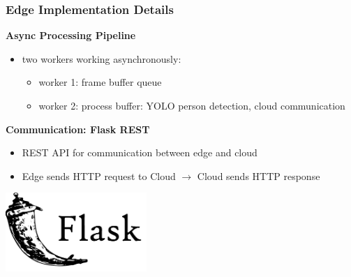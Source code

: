 \documentclass{beamer}
\begin{document}
\begin{frame}
    \frametitle{Edge Implementation Details}
    \textbf{Async Processing Pipeline}
    \begin{itemize}

    \item two workers working asynchronously: 
    \begin{itemize}
        \item worker 1: frame buffer queue
        \item worker 2: process buffer: YOLO person detection, cloud communication
    \end{itemize}

\end{itemize}

\textbf{Communication: Flask REST}
\begin{itemize}
    \item REST API for communication between edge and cloud
    \item Edge sends HTTP request to Cloud $\rightarrow$ Cloud sends HTTP response
\end{itemize}
\begin{center}

    \includegraphics[width=0.4\textwidth]{./res/flask.png}
\end{center}

    \end{frame}
\end{document}

